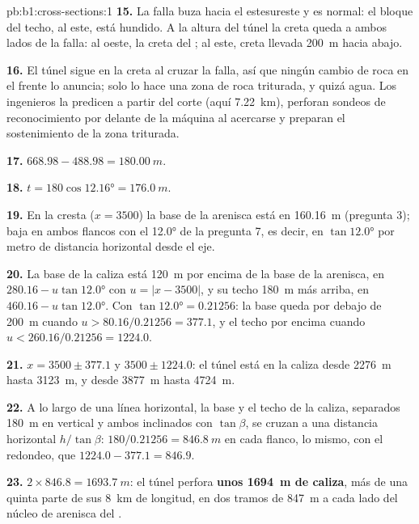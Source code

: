 \begin{solution}{pb:b1:cross-sections:1}
\textbf{15.} La falla buza hacia el estesureste y es normal: el bloque del techo, al este, está
hundido. A la altura del túnel la creta queda a ambos lados de la falla: al oeste, la creta del
; al este, creta llevada \qty{200}{m} hacia abajo.

\textbf{16.} El túnel sigue en la creta al cruzar la falla, así que ningún cambio de roca en el frente
lo anuncia; solo lo hace una zona de roca triturada, y quizá agua. Los ingenieros la predicen a partir
del corte (aquí \qty{7.22}{km}), perforan sondeos de reconocimiento por delante de la máquina al
acercarse y preparan el sostenimiento de la zona triturada.

\textbf{17.} $668.98 - 488.98 = \qty{180.00}{m}$.

\textbf{18.} $t = 180\cos\ang{12.16} = \qty{176.0}{m}$.

\textbf{19.} En la cresta ($x = 3500$) la base de la arenisca está en \qty{160.16}{m} (pregunta 3);
baja en ambos flancos con el  \ang{12.0} de la pregunta 7, es decir, en
$\tan\ang{12.0}$ por metro de distancia horizontal desde el eje.

\textbf{20.} La base de la caliza está \qty{120}{m} por encima de la base de la arenisca, en
$280.16 - u\tan\ang{12.0}$ con $u = |x - 3500|$, y su techo \qty{180}{m} más arriba, en
$460.16 - u\tan\ang{12.0}$. Con $\tan\ang{12.0} =
0.21256$: la base queda por debajo de
\qty{200}{m} cuando $u > 80.16/0.21256 = 377.1$, y el techo por encima cuando
$u < 260.16/0.21256 = 1224.0$.

\textbf{21.} $x = 3500 \pm 377.1$ y $3500 \pm 1224.0$: el túnel está en la caliza desde
\qty{2276}{m} hasta \qty{3123}{m}, y desde \qty{3877}{m} hasta \qty{4724}{m}.

\textbf{22.} A lo largo de una línea horizontal, la base y el techo de la caliza, separados
\qty{180}{m} en vertical y ambos inclinados con $\tan\beta$, se cruzan a una distancia horizontal
$h/\tan\beta$: $180/0.21256 = \qty{846.8}{m}$ en cada flanco, lo mismo, con el redondeo, que
$1224.0 - 377.1 = 846.9$.

\textbf{23.} $2\times846.8 = \qty{1693.7}{m}$: el túnel perfora
\textbf{unos \qty[text-series-to-math=true]{1694}{m} de caliza}, más de una quinta parte de sus
\qty{8}{km} de longitud, en dos tramos de \qty{847}{m} a cada lado del núcleo de arenisca del
.
\end{solution}
